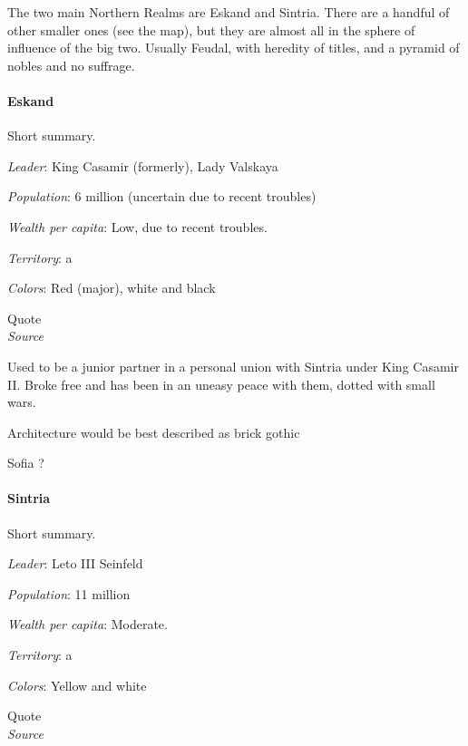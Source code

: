 The two main Northern Realms are Eskand and Sintria. There are a handful of other smaller ones (see the map), but they are almost all in the sphere of influence of the big two. Usually Feudal, with heredity of titles, and a pyramid of nobles and no suffrage.

\paragraph{Eskand}


Short summary.


\textit{Leader}: King Casamir (formerly), Lady Valskaya

\textit{Population}: 6 million (uncertain due to recent troubles)

\textit{Wealth per capita}: Low, due to recent troubles.

\textit{Territory}: a
    
\textit{Colors}: Red (major), white and black


\begin{rpg-quotebox}
Quote \\ \textendash \textit{Source}
\end{rpg-quotebox}



Used to be a junior partner in a personal union with Sintria under King Casamir II.
Broke free and has been in an uneasy peace with them, dotted with small wars.
    

Architecture would be best described as brick gothic



Sofia ?



\paragraph{Sintria}

Short summary.

\textit{Leader}: Leto III Seinfeld

\textit{Population}: 11 million

\textit{Wealth per capita}: Moderate.

\textit{Territory}: a
    
\textit{Colors}: Yellow and white


\begin{rpg-quotebox}
    Quote \\ \textendash \textit{Source}
    \end{rpg-quotebox}


